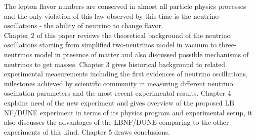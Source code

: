The lepton flavor numbers are conserved in almost all particle physics processes and the only violation of this law observed by this time is the neutrino oscillations - the ability of neutrino to change flavor.\\ 
Chapter 2 of this paper reviews the theoretical background of the neutrino oscillations starting from simplified two-neutrinos model in vacuum to three-neutrinos model in presence of matter and also discussed possible mechanisms of neutrinos to get masses. Chapter 3 gives historical background to related experimental measurements including the first evidences of neutrino oscillations, milestones achieved by scientific community in measuring different neutrino oscillation parameters and the most recent experimental results. Chapter 4 explains need of the new experiment and gives overview of the proposed LB NF/DUNE experiment in terms of its physics program and experimental setup, it also discusses the advantages of the LBNF/DUNE comparing to the other experiments of this kind. Chapter 5 draws conclusions.  


